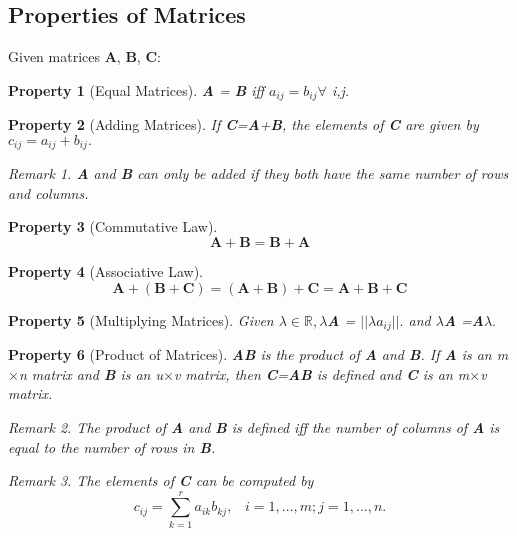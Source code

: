 \documentclass[10pt,legalpaper]{book}
\theoremstyle{definition}
\theoremstyle{plain}
\newtheorem{prop}{Property}
\theoremstyle{remark}
\newtheorem{proprem}{Remark}[prop]
\begin{document}
\subsection{Properties of Matrices}
Given matrices \textbf{A}, \textbf{B}, \textbf{C}: 
\begin{prop}[Equal Matrices]
\textbf{A} = \textbf{B} iff $a_{ij} = b_{ij} \forall$ i,j.
\end{prop}

\begin{prop}[Adding Matrices]
If \textbf{C}=\textbf{A}+\textbf{B}, the elements of 
\textbf{C} are given by $c_{ij}=a_{ij}+b_{ij}.$
\begin{proprem}
\textbf{A} and \textbf{B} can only be added if they both have the same number of rows and columns.
\end{proprem} 
\end{prop}

\begin{prop}[Commutative Law]
\begin{equation}
\textbf{A}+\textbf{B}=\textbf{B}+\textbf{A}
\end{equation}	
\end{prop}

\begin{prop}[Associative Law]
\begin{equation}
\textbf{A}+(\textbf{B}+\textbf{C})=(\textbf{A}+\textbf{B})+\textbf{C}=\textbf{A}+\textbf{B}+\textbf{C}
\end{equation}	
\end{prop}

\begin{prop}[Multiplying Matrices]
Given $\lambda \in \mathbb{R}, \lambda$\textbf{A} = $||\lambda a_{ij}||.$ and $\lambda$\textbf{A} =\textbf{A}$\lambda.$
\end{prop}

\begin{prop}[Product of Matrices]
\textbf{A}\textbf{B} is the product of \textbf{A} and \textbf{B}. If \textbf{A} is an m$\times$n matrix and \textbf{B} is an u$\times$v matrix, then \textbf{C}=\textbf{A}\textbf{B} is defined and \textbf{C} is an m$\times$v matrix. 
\begin{proprem}
The product of \textbf{A} and \textbf{B} is defined iff the number of columns of \textbf{A} is equal to the number of rows in \textbf{B}. 
\end{proprem}
\begin{proprem}
The elements of \textbf{C} can be computed by 
\begin{equation}
c_{ij}=\sum\limits_{k=1}^r a_{ik}b_{kj},\;\;\;i=1,...,m; j=1,...,n.
\end{equation}
\end{proprem}
\end{prop}
\end{document}
